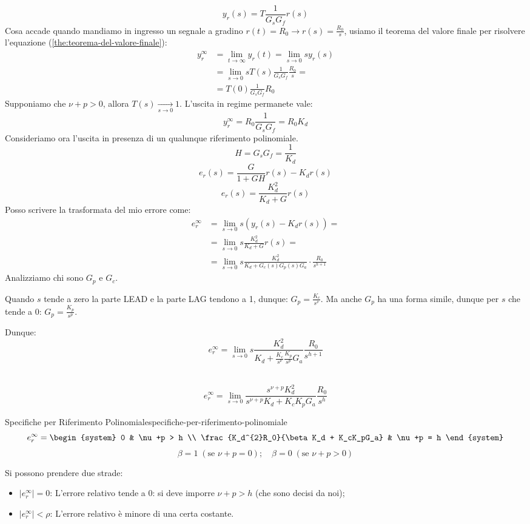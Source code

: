 \documentclass[12pt]{article}
\begin{document}
\[ y_r(s) = T \frac{1}{G_sG_f} r(s) \]
Cosa accade quando mandiamo in ingresso un segnale a gradino $r(t) = R_0 \to r(s) = \frac{R_0}{s}$, usiamo il teorema del valore finale per risolvere l'equazione (\ref{the:teorema-del-valore-finale}):
\begin{align*}
y_r^{\infty} & = \lim_{t \to \infty} y_r(t) = \lim_{s \to 0} sy_r(s) \\
& = \lim_{s \to 0} s T(s) \frac{1}{G_sG_f} \frac{R_0}{s} = \\
& = T(0) \frac{1}{G_sG_f} R_0 
\end{align*}
Supponiamo che $\nu + p > 0$, allora $T(s) \underset{s \to 0}{\longrightarrow} 1$. L'uscita in regime permanete vale:
\[ \boxed{y_r^{\infty} = R_0 \frac{1}{G_sG_f} = R_0 K_d} \]
Consideriamo ora l'uscita in presenza di un qualunque riferimento polinomiale.
\[ H = G_sG_f = \frac{1}{K_d} \]
\[ e_r(s) = \frac{G}{1 + GH}  r(s) - K_dr(s) \]
\[ \boxed{ e_r(s) = \frac{K_d^{2}}{K_d + G} r(s) } \]
Posso scrivere la trasformata del mio errore come:
\begin{align*}
e_r^{\infty} & = \lim_{s \to 0} s (y_r(s) - K_dr(s)) = \\
     & = \lim_{s \to 0} s \frac{K_d^{2}}{K_d + G} r(s) = \\
     & = \boxed{\lim_{s \to 0} s\frac{K_d^{2}}{K_d + G_c(s)G_p(s)G_a} \cdot \frac{R_0}{s^{h+1}} }
\end{align*}
Analizziamo chi sono $G_p$ e $G_c$.

Quando $s$ tende a zero la parte LEAD e la parte LAG tendono a 1, dunque:
$G_p = \frac{K_c}{s^{\nu}} $.
Ma anche $G_p$ ha una forma simile, dunque per $s$ che tende a 0: $G_p = \frac{K_p}{s^{p}} $.

Dunque:
\[ e_r^{\infty} = \lim_{s \to 0} s \frac{K_d^{2}}{K_d + \frac{K_c}{s^{\nu}} \frac{K_p}{s^{p}} G_a } \frac{R_0}{s^{h+1}}   \]\

\[ e_r^{\infty} = \lim_{s \to 0}  \frac{s^{\nu+p}K_d^{2}}{s^{\nu+p}K_d + K_cK_pG_a} \frac{R_0}{s^{h}} \]
\begin{theorem}{Specifiche per Riferimento Polinomiale}{specifiche-per-riferimento-polinomiale}
    \[ e_r^{\infty} = \begin{system} 
    0 & \nu+p > h \\
    \frac{K_d^{2}R_0}{\beta K_d + K_cK_pG_a} & \nu+p = h
    \end{system}  \]
    \[ \beta  = 1\;(\text{se }\nu + p = 0) ;\quad \beta = 0\; (\text{se }\nu + p > 0)  \]
    \end{theorem}
Si possono prendere due strade:
\begin{itemize}
    \item $|e_r^{\infty}| = 0$: L'errore relativo tende a 0: si deve imporre $\nu + p > h$ (che sono decisi da noi);
    \item $|e_r^{\infty}| < \rho$: L'errore relativo \`e minore di una certa costante.
\end{itemize}
\end{document}
